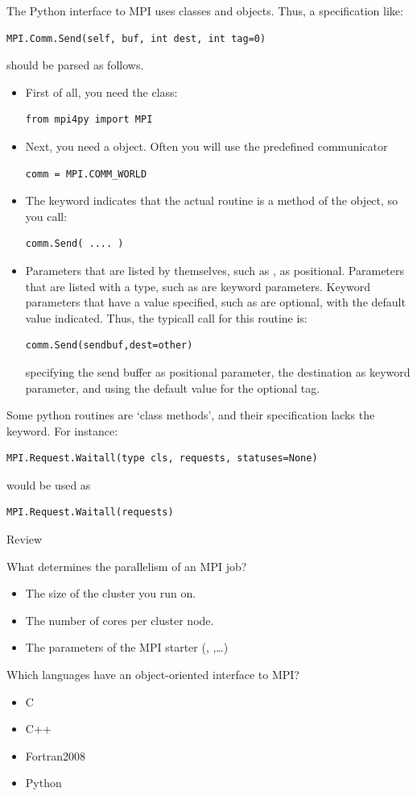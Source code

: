 The Python interface to MPI uses classes and objects. Thus, a
specification like:
\lstset{language=Python} %
\begin{lstlisting}
MPI.Comm.Send(self, buf, int dest, int tag=0)
\end{lstlisting}
should be parsed as follows.
\begin{itemize}
\item First of all, you need the  class:
\begin{lstlisting}
from mpi4py import MPI
\end{lstlisting}
\item Next, you need a  object. Often you will use the
  predefined communicator
\begin{lstlisting}
comm = MPI.COMM_WORLD
\end{lstlisting}
\item The keyword  indicates that the actual routine 
  is a method of the  object, so you call:
\begin{lstlisting}
comm.Send( .... )
\end{lstlisting}
\item Parameters that are listed by themselves, such as , as
  positional. Parameters that are listed with a type, such as  are keyword parameters. Keyword parameters that have a value
  specified, such as  are optional, with the default
  value indicated. Thus, the typicall call for this routine is:
\begin{lstlisting}
comm.Send(sendbuf,dest=other)
\end{lstlisting}
  specifying the send buffer as positional parameter, the destination
  as keyword parameter, and using the default value for the optional tag.
\end{itemize}
Some python routines are `class methods', and their specification
lacks the  keyword. For instance:
\begin{lstlisting}
MPI.Request.Waitall(type cls, requests, statuses=None)
\end{lstlisting}
would be used as
\begin{lstlisting}
MPI.Request.Waitall(requests)
\end{lstlisting}
\lstset{language=C} %

 {Review}

\begin{review}
  What determines the parallelism of an MPI job?
  \begin{itemize}
  \item The size of the cluster you run on.
  \item The number of cores per cluster node.
  \item The parameters of the MPI starter (,
    ,\ldots)
  \end{itemize}
\end{review}

\begin{review}
  Which languages have an object-oriented interface to MPI?
  \begin{itemize}
  \item C
  \item C++
  \item Fortran2008
  \item Python
  \end{itemize}
\end{review}
